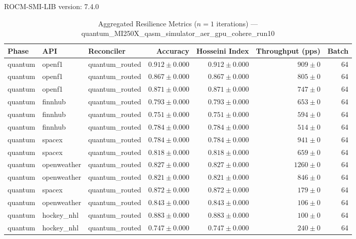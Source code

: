 ROCM-SMI-LIB version: 7.4.0

\begin{table}[htbp]
\caption{Aggregated Resilience Metrics ($n=1$ iterations) --- quantum_MI250X_qasm_simulator_aer_gpu_cohere_run10}
\begin{tabular}{l l l r r r r}
\hline
Phase & API & Reconciler & Accuracy & Hosseini Index & Throughput (pps) & Batch \\
\hline
quantum & openf1 & quantum\_routed & $0.912\pm0.000$ & $0.912\pm0.000$ & $909\pm0$ & 64 \\
quantum & openf1 & quantum\_routed & $0.867\pm0.000$ & $0.867\pm0.000$ & $805\pm0$ & 64 \\
quantum & openf1 & quantum\_routed & $0.871\pm0.000$ & $0.871\pm0.000$ & $747\pm0$ & 64 \\
quantum & finnhub & quantum\_routed & $0.793\pm0.000$ & $0.793\pm0.000$ & $653\pm0$ & 64 \\
quantum & finnhub & quantum\_routed & $0.751\pm0.000$ & $0.751\pm0.000$ & $594\pm0$ & 64 \\
quantum & finnhub & quantum\_routed & $0.784\pm0.000$ & $0.784\pm0.000$ & $514\pm0$ & 64 \\
quantum & spacex & quantum\_routed & $0.784\pm0.000$ & $0.784\pm0.000$ & $941\pm0$ & 64 \\
quantum & spacex & quantum\_routed & $0.818\pm0.000$ & $0.818\pm0.000$ & $659\pm0$ & 64 \\
quantum & openweather & quantum\_routed & $0.827\pm0.000$ & $0.827\pm0.000$ & $1260\pm0$ & 64 \\
quantum & openweather & quantum\_routed & $0.821\pm0.000$ & $0.821\pm0.000$ & $846\pm0$ & 64 \\
quantum & spacex & quantum\_routed & $0.872\pm0.000$ & $0.872\pm0.000$ & $179\pm0$ & 64 \\
quantum & openweather & quantum\_routed & $0.843\pm0.000$ & $0.843\pm0.000$ & $106\pm0$ & 64 \\
quantum & hockey\_nhl & quantum\_routed & $0.883\pm0.000$ & $0.883\pm0.000$ & $100\pm0$ & 64 \\
quantum & hockey\_nhl & quantum\_routed & $0.747\pm0.000$ & $0.747\pm0.000$ & $240\pm0$ & 64 \\

\end{tabular}
\end{table}
